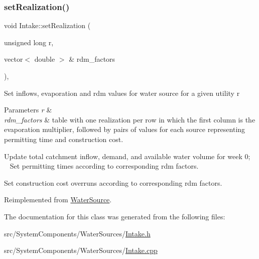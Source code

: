 \subsubsection{\texorpdfstring{set\+Realization()}{setRealization()}}
{\footnotesize\ttfamily void Intake\+::set\+Realization (\begin{DoxyParamCaption}\item[{unsigned long}]{r,  }\item[{vector$<$ double $>$ \&}]{rdm\+\_\+factors }\end{DoxyParamCaption})\hspace{0.3cm}{\ttfamily [override]}, {\ttfamily [virtual]}}

Set inflows, evaporation and rdm values for water source for a given utility r 
\begin{DoxyParams}{Parameters}
{\em r} & \\
\hline
{\em rdm\+\_\+factors} & table with one realization per row in which the first column is the evaporation multiplier, followed by pairs of values for each source representing permitting time and construction cost. \\
\hline
\end{DoxyParams}
Update total catchment inflow, demand, and available water volume for week 0; ~\newline
~\newline
 Set permitting times according to corresponding rdm factors.

Set construction cost overruns according to corresponding rdm factors. 

Reimplemented from \mbox{\hyperlink{classWaterSource_af72660e62fda45b6ae53da5f0afd86db_af72660e62fda45b6ae53da5f0afd86db}{Water\+Source}}.



The documentation for this class was generated from the following files\+:\begin{DoxyCompactItemize}
\item 
src/\+System\+Components/\+Water\+Sources/\mbox{\hyperlink{Intake_8h}{Intake.\+h}}\item 
src/\+System\+Components/\+Water\+Sources/\mbox{\hyperlink{Intake_8cpp}{Intake.\+cpp}}\end{DoxyCompactItemize}
